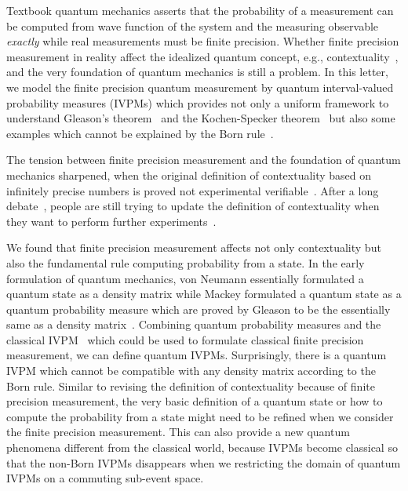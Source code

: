 \documentclass[english,reprint, aps, prl,superscriptaddress, showpacs,
showkeys, longbibliography, amsmath, amssymb]{revtex4-1}
\theoremstyle{plain}
\theoremstyle{definition}
\begin{document}
\maketitle

Textbook quantum mechanics asserts that the probability of a measurement
can be computed from wave function of the system and the measuring
observable \emph{exactly} while real measurements must be finite precision.
Whether finite precision measurement in reality affect the idealized
quantum concept, e.g., contextuality~\cite{PhysRevLett.83.3751,Mermin1999,BarrettKent2004},
and the very foundation of quantum mechanics is still a problem. In
this letter, we model the finite precision quantum measurement by
quantum interval-valued probability measures (IVPMs) which provides
not only a uniform framework to understand Gleason's theorem~\cite{gleason1957,Redhead1987-REDINA,peres1995quantum}
and the Kochen-Specker theorem~\cite{kochenspecker1967,peres1995quantum,Redhead1987-REDINA,Griffiths2003}
but also some examples which cannot be explained by the Born rule~\cite{Born1983,peres1995quantum,544199,Jaeger2007}.

The tension between finite precision measurement and the foundation
of quantum mechanics sharpened, when the original definition of contextuality
based on infinitely precise numbers is proved not experimental verifiable~\cite{PhysRevLett.83.3751,Kent1999}.
After a long debate~\cite{Mermin1999,Peres2003,BarrettKent2004},
people are still trying to update the definition of contextuality
when they want to perform further experiments~\cite{Spekkens2005,GuehneKleinmannCabelloEtAl2010,MazurekPuseyKunjwalEtAl2016}.

We found that finite precision measurement affects not only contextuality
but also the fundamental rule computing probability from a state.
In the early formulation of quantum mechanics, von Neumann essentially
formulated a quantum state as a density matrix while Mackey formulated
a quantum state as a quantum probability measure which are proved
by Gleason to be the essentially same as a density matrix~\cite{Varadarajan2008}.
Combining quantum probability measures and the classical IVPM~\cite{JamisonLodwick2004}
which could be used to formulate classical finite precision measurement,
we can define quantum IVPMs. Surprisingly, there is a quantum IVPM
which cannot be compatible with any density matrix according to the
Born rule. Similar to revising the definition of contextuality because
of finite precision measurement, the very basic definition of a quantum
state or how to compute the probability from a state might need to
be refined when we consider the finite precision measurement. This
can also provide a new quantum phenomena different from the classical
world, because IVPMs become classical so that the non-Born IVPMs disappears
when we restricting the domain of quantum IVPMs on a commuting sub-event
space. \newpage{}
\end{document}

